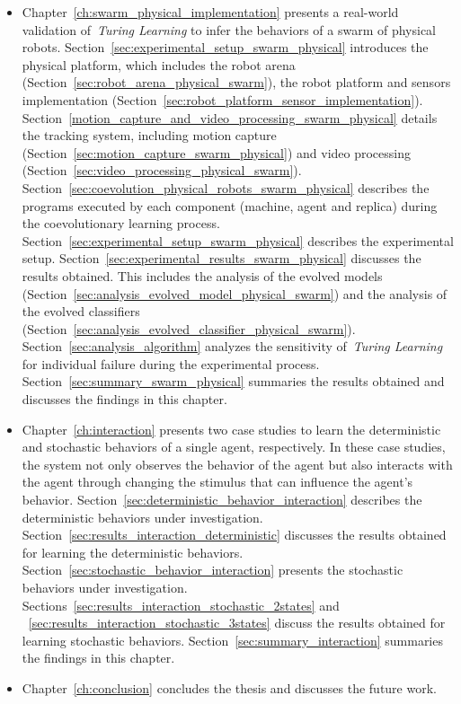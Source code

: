 \begin{itemize}
\item Chapter~\ref{ch:swarm_physical_implementation} presents a real-world validation of~\textit{Turing Learning} to infer the behaviors of a swarm of physical robots. Section~\ref{sec:experimental_setup_swarm_physical} introduces the physical platform, which includes the robot arena (Section~\ref{sec:robot_arena_physical_swarm}), the robot platform and sensors implementation (Section~\ref{sec:robot_platform_sensor_implementation}). Section~\ref{motion_capture_and_video_processing_swarm_physical} details the tracking system, including motion capture (Section~\ref{sec:motion_capture_swarm_physical}) and video processing (Section~\ref{sec:video_processing_physical_swarm}). Section~\ref{sec:coevolution_physical_robots_swarm_physical} describes the programs executed by each component (machine, agent and replica) during the coevolutionary learning process. Section~\ref{sec:experimental_setup_swarm_physical} describes the experimental setup. Section~\ref{sec:experimental_results_swarm_physical} discusses the results obtained. This includes the analysis of the evolved models (Section~\ref{sec:analysis_evolved_model_physical_swarm}) and the analysis of the evolved classifiers (Section~\ref{sec:analysis_evolved_classifier_physical_swarm}). Section~\ref{sec:analysis_algorithm} analyzes the sensitivity of~\textit{Turing Learning} for individual failure during the experimental process. Section~\ref{sec:summary_swarm_physical} summaries the results obtained and discusses the findings in this chapter.

\item Chapter~\ref{ch:interaction} presents two case studies to learn the deterministic and stochastic behaviors of a single agent, respectively. In these case studies, the system not only observes the behavior of the agent but also interacts with the agent through changing the stimulus that can influence the agent's behavior. Section~\ref{sec:deterministic_behavior_interaction} describes the deterministic behaviors under investigation. Section~\ref{sec:results_interaction_deterministic} discusses the results obtained for learning the deterministic behaviors. Section~\ref{sec:stochastic_behavior_interaction} presents the stochastic behaviors under investigation. Sections~\ref{sec:results_interaction_stochastic_2states} and ~\ref{sec:results_interaction_stochastic_3states} discuss the results obtained for learning stochastic behaviors. Section~\ref{sec:summary_interaction} summaries the findings in this chapter.

\item Chapter~\ref{ch:conclusion} concludes the thesis and discusses the future work. 

\end{itemize}
